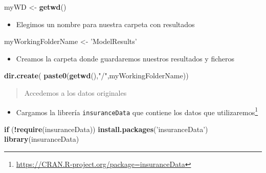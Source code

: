 \documentclass[]{book}
\newenvironment{Shaded}{\begin{snugshade}}{\end{snugshade}}
\newcommand{\ControlFlowTok}[1]{\textcolor[rgb]{0.13,0.29,0.53}{\textbf{#1}}}
\newcommand{\KeywordTok}[1]{\textcolor[rgb]{0.13,0.29,0.53}{\textbf{#1}}}
\newcommand{\NormalTok}[1]{#1}
\newcommand{\OperatorTok}[1]{\textcolor[rgb]{0.81,0.36,0.00}{\textbf{#1}}}
\newcommand{\StringTok}[1]{\textcolor[rgb]{0.31,0.60,0.02}{#1}}
\providecommand{\tightlist}{%
  \setlength{\itemsep}{0pt}\setlength{\parskip}{0pt}}
\let\rmarkdownfootnote\footnote%
\def\footnote{\protect\rmarkdownfootnote}
\begin{document}
\begin{Shaded}
\begin{Highlighting}[]
\NormalTok{myWD <-}\StringTok{ }\KeywordTok{getwd}\NormalTok{() }
\end{Highlighting}
\end{Shaded}

\begin{itemize}
\tightlist
\item
  Elegimos un nombre para nuestra carpeta con resultados
\end{itemize}

\begin{Shaded}
\begin{Highlighting}[]
\NormalTok{myWorkingFolderName <-}\StringTok{ 'ModelResults'} 
\end{Highlighting}
\end{Shaded}

\begin{itemize}
\tightlist
\item
  Creamos la carpeta donde guardaremos nuestros resultados y ficheros
\end{itemize}

\begin{Shaded}
\begin{Highlighting}[]
\KeywordTok{dir.create}\NormalTok{( }\KeywordTok{paste0}\NormalTok{(}\KeywordTok{getwd}\NormalTok{(),}\StringTok{"/"}\NormalTok{,myWorkingFolderName))}
\end{Highlighting}
\end{Shaded}

\begin{quote}
Accedemos a los datos originales
\end{quote}

\begin{itemize}
\tightlist
\item
  Cargamos la librería \texttt{insuranceData} que contiene los datos que utilizaremos\footnote{\url{https://CRAN.R-project.org/package=insuranceData}}
\end{itemize}

\begin{Shaded}
\begin{Highlighting}[]
\ControlFlowTok{if}\NormalTok{ (}\OperatorTok{!}\KeywordTok{require}\NormalTok{(insuranceData)) }\KeywordTok{install.packages}\NormalTok{(}\StringTok{'insuranceData'}\NormalTok{)}
\KeywordTok{library}\NormalTok{(insuranceData)}
\end{Highlighting}
\end{Shaded}
\end{document}
